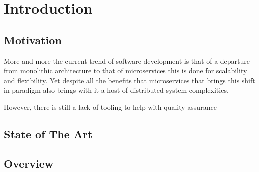 \chapter{\centering Introduction}

\section{Motivation}
More and more the current trend of software development is that of a departure 
from monolithic architecture to that of microservices this is done for scalability 
and flexibility. Yet despite all the benefits that microservices that brings
this shift in paradigm also brings with it a host of distributed system complexities.

However, there is still a lack of tooling to help with quality assurance

\section{State of The Art}

\section{Overview}

